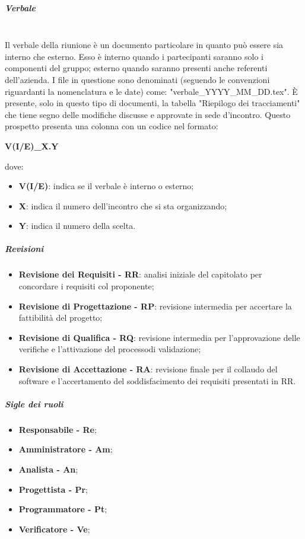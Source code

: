                 \subparagraph{Verbale}\mbox{}\\ [1mm]
                    Il verbale della riunione è un documento particolare in quanto può essere sia interno che esterno. Esso è interno quando
                    i partecipanti saranno solo i componenti del gruppo; esterno quando saranno presenti anche referenti dell'azienda. I file in questione sono denominati (seguendo le convenzioni riguardanti la nomenclatura e le date) come: "verbale\_YYYY\_MM\_DD.tex".
                    È presente, solo in questo tipo di documenti, la tabella "Riepilogo dei tracciamenti" che tiene segno delle modifiche discusse e
                    approvate in sede d'incontro. Questo prospetto presenta una colonna con un codice nel formato: \newline \newline
                    \centerline{\textbf{V(I/E)\_X.Y}} \newline \newline
                    dove:
                    \begin{itemize}
                        \item \textbf{V(I/E)}: indica se il verbale è interno o esterno;
                        \item \textbf{X}: indica il numero dell'incontro che si sta organizzando;
                        \item \textbf{Y}: indica il numero della scelta.
                    \end{itemize}
                \subparagraph{Revisioni}
                \begin{itemize}
                    \item \textbf{Revisione dei Requisiti - RR}: analisi iniziale del capitolato per concordare i requisiti col proponente;
                    \item \textbf{Revisione di Progettazione - RP}: revisione intermedia per accertare la fattibilità del progetto\glo;
                    \item \textbf{Revisione di Qualifica - RQ}: revisione intermedia per l'approvazione delle verifiche e l'attivazione del processo\glosp di validazione\glo;
                    \item \textbf{Revisione di Accettazione - RA}: revisione finale per il collaudo del software e l'accertamento del soddisfacimento dei requisiti presentati in RR.
                \end{itemize}
                \subparagraph{Sigle dei ruoli}
                    \begin{itemize}
                        \item \textbf{Responsabile - Re};
                        \item \textbf{Amministratore - Am};
                        \item \textbf{Analista - An};
                        \item \textbf{Progettista - Pr};
                        \item \textbf{Programmatore - Pt};
                        \item \textbf{Verificatore - Ve};
                    \end{itemize}
